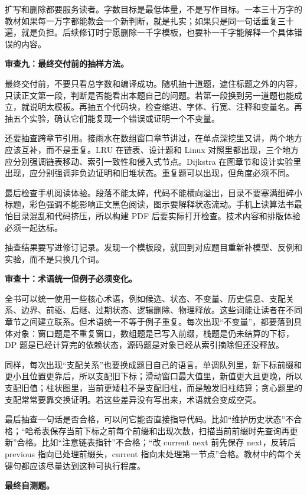 扩写和删除都要服务读者。字数目标是最低体量，不是写作目标。一本三十万字的教材如果每一万字都能教会一个新判断，就是扎实；如果只是同一句话重复三十遍，就是负担。后续修订时宁愿删除一千字模板，也要补一千字能解释一个具体错误的内容。

\noindent\textbf{审查九：最终交付前的抽样方法。}

最终交付前，不要只看总字数和编译成功。随机抽十道题，遮住标题之外的内容，只读正文第一段，判断是否能看出本题自己的问题。若第一段换到另一道题也能成立，就说明太模板。再抽五个代码块，检查缩进、字体、行宽、注释和变量名。再抽五个实验，确认它们能复现一个错误或证明一个不变量。

还要抽查跨章节引用。接雨水在数组窗口章节讲过，在单点深挖里又讲，两个地方应该互补，而不是重复。LRU 在链表、设计题和 Linux 对照里都出现，三个地方应分别强调链表移动、索引一致性和侵入式节点。Dijkstra 在图章节和设计实验里出现，应分别强调非负边证明和旧堆状态。重复题可以出现，但角度必须不同。

最后检查手机阅读体验。段落不能太碎，代码不能横向溢出，目录不要塞满细碎小标题，彩色强调不能影响正文黑色阅读，图示要解释状态流动。手机上读算法书最怕目录混乱和代码挤压，所以构建 PDF 后要实际打开检查。技术内容和排版体验必须一起达标。

抽查结果要写进修订记录。发现一个模板段，就回到对应题目重新补模型、反例和实验，而不是只换几个词。

\noindent\textbf{审查十：术语统一但例子必须变化。}

全书可以统一使用一些核心术语，例如候选、状态、不变量、历史信息、支配关系、边界、前驱、后继、过期状态、逻辑删除、物理释放。这些词能让读者在不同章节之间建立联系。但术语统一不等于例子重复。每次出现“不变量”，都要落到具体对象：窗口题是不重复窗口，数组题是已写入前缀，栈题是仍未结算的下标，DP 题是已经计算完的依赖状态，源码题是对象已经从索引摘除但还没释放。

同样，每次出现“支配关系”也要换成题目自己的语言。单调队列里，新下标前缀和更小且位置更靠后，所以支配旧下标；滑动窗口最大值里，新值更大且更晚，所以支配旧值；柱状图里，当前更矮柱不是支配旧柱，而是触发旧柱结算；贪心题里的支配常常要靠交换证明。若这些差异没有写出来，术语就会变成空壳。

最后抽查一句话是否合格，可以问它能否直接指导代码。比如“维护历史状态”不合格；“哈希表保存当前下标之前每个前缀和出现次数，扫描当前前缀时先查询再更新”合格。比如“注意链表指针”不合格；“改 current next 前先保存 next，反转后 previous 指向已处理前缀头，current 指向未处理第一节点”合格。教材中的每个关键句都应该尽量达到这种可执行程度。

\noindent\textbf{最终自测题。}

